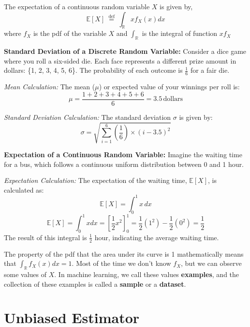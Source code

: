The expectation of a continuous random variable \(X\) is given by,
$$
	\mathbb{E}[X] \stackrel{\text { def }}{=} \int_{\mathbb{R}} x f_{X}(x) d x
$$
where \(f_{X}\) is the pdf of the variable \(X\) and \(\int_{\mathbb{R}}\) is the integral of function \(x f_{X}\)
\begin{tcolorbox}[enhanced jigsaw, breakable, pad at break*=1mm, colback=gray!20!white, colframe=black!85!black, title=\textbf{Real-Life Examples of Probability Concepts}]

	\textbf{Standard Deviation of a Discrete Random Variable:}
	Consider a dice game where you roll a six-sided die. Each face represents a different prize amount in dollars: \{1, 2, 3, 4, 5, 6\}. The probability of each outcome is \( \frac{1}{6} \) for a fair die.

	\textit{Mean Calculation:}
	The mean (\( \mu \)) or expected value of your winnings per roll is:
	\[ \mu = \frac{1+2+3+4+5+6}{6} = 3.5 \, \text{dollars} \]

	\textit{Standard Deviation Calculation:}
	The standard deviation \( \sigma \) is given by:
	\[ \sigma = \sqrt{\sum_{i=1}^{6} \left(\frac{1}{6}\right) \times (i - 3.5)^2} \]

	\textbf{Expectation of a Continuous Random Variable:}
	Imagine the waiting time for a bus, which follows a continuous uniform distribution between 0 and 1 hour.

	\textit{Expectation Calculation:}
	The expectation of the waiting time, \( \mathbb{E}[X] \), is calculated as:
	\[ \mathbb{E}[X] = \int_{0}^{1} x \, dx \]
	$$
		\mathbb{E}[X]=\int_{0}^{1} x d x=\left[\frac{1}{2} x^{2}\right]_{0}^{1}=\frac{1}{2}\left(1^{2}\right)-\frac{1}{2}\left(0^{2}\right)=\frac{1}{2}
	$$
	The result of this integral is \( \frac{1}{2} \) hour, indicating the average waiting time.
\end{tcolorbox}
The property of the pdf that the area under its curve is 1 mathematically means that \(\int_{\mathbb{R}} f_{X}(x) d x=1\). Most of the time we don't know \(f_{X}\), but we can observe some values of \(X\). In machine learning, we call these values \textbf{examples}, and the collection of these examples is called a \textbf{sample} or a \textbf{dataset}.

\section{Unbiased Estimator}